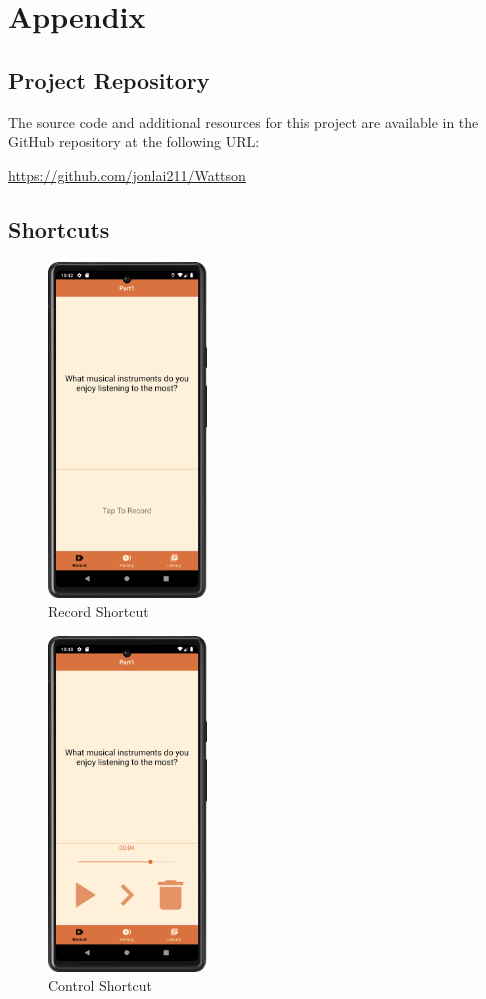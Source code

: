 \documentclass[conference,10pt,letterpaper]{IEEEtran}
\begin{document}
	\newpage
	\appendix
	\section{Appendix}
	\subsection{Project Repository}
	The source code and additional resources for this project are available in the GitHub repository at the following URL:
	
	\uline{\url{https://github.com/jonlai211/Wattson}}
	
	\subsection{Shortcuts}
	\begin{figure}[htbp]
		\centerline{\includegraphics[height=3.5in]{src/record shortcut.png}}
		\caption{Record Shortcut}
		\label{fig:record_shortcut}
	\end{figure}
	
	\begin{figure}[htbp]
		\centerline{\includegraphics[height=3.5in]{src/control shortcut.png}}
		\caption{Control Shortcut}
		\label{fig:control_shortcut}
	\end{figure}
	
\end{document}
